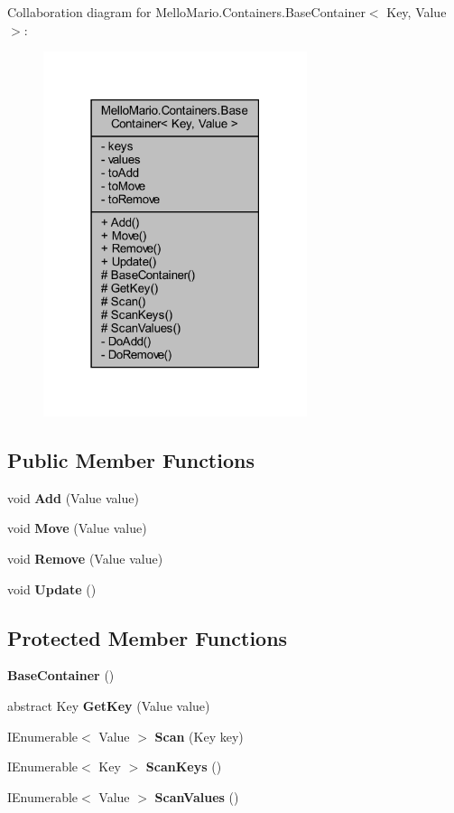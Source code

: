 Collaboration diagram for Mello\+Mario.\+Containers.\+Base\+Container$<$ Key, Value $>$\+:
\nopagebreak
\begin{figure}[H]
\begin{center}
\leavevmode
\includegraphics[width=219pt]{classMelloMario_1_1Containers_1_1BaseContainer__coll__graph}
\end{center}
\end{figure}
\subsection*{Public Member Functions}
\begin{DoxyCompactItemize}
\item 
void \textbf{ Add} (Value value)
\item 
void \textbf{ Move} (Value value)
\item 
void \textbf{ Remove} (Value value)
\item 
void \textbf{ Update} ()
\end{DoxyCompactItemize}
\subsection*{Protected Member Functions}
\begin{DoxyCompactItemize}
\item 
\textbf{ Base\+Container} ()
\item 
abstract Key \textbf{ Get\+Key} (Value value)
\item 
I\+Enumerable$<$ Value $>$ \textbf{ Scan} (Key key)
\item 
I\+Enumerable$<$ Key $>$ \textbf{ Scan\+Keys} ()
\item 
I\+Enumerable$<$ Value $>$ \textbf{ Scan\+Values} ()
\end{DoxyCompactItemize}
